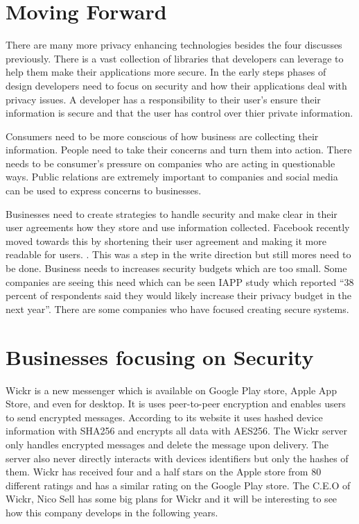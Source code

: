 \documentclass[12pt]{article}
\begin{document}
\section{Moving Forward}\label{sec:moving-forward}
There are many more privacy enhancing technologies besides the four discusses previously. There is a vast collection of libraries that developers can leverage to help them make their applications more secure. In the early steps phases of design developers need to focus on security and how their applications deal with privacy issues. A developer has a responsibility to their user's ensure their information is secure and that the user has control over thier private information. 

Consumers need to be more conscious of how business are collecting their information. People need to take their concerns and turn them into action. There needs to be consumer's pressure on companies who are acting in questionable ways. Public relations are extremely important to companies and social media can be used to express concerns to businesses. 

Businesses need to create strategies to handle security and make clear in their user agreements how they store and use information collected. Facebook recently moved towards this by shortening their user agreement and making it more readable for users. \cite{Albergotti}. This was a step in the write direction but still mores need to be done. Business needs to increases security budgets which are too small. Some companies are seeing this need which can be seen  IAPP study which reported ``38 percent of respondents said they would likely increase their privacy budget in the next year''\cite{Solove}. There are some companies who have focused creating secure systems.

\section{Businesses focusing on Security}\label{sec:real-life}
Wickr is a new messenger which is available on Google Play store, Apple App Store, and even for desktop. It is uses peer-to-peer encryption and enables users to send encrypted messages.  According to its website it uses hashed device information with SHA256 and encrypts all data with AES256. The Wickr server only handles encrypted messages and delete the message upon delivery. The server also never directly interacts with devices identifiers but only the hashes of them. Wickr has received four and a half stars on the Apple store from 80 different ratings and has a similar rating on the Google Play store. The C.E.O of Wickr, Nico Sell has some big plans for Wickr and it will be interesting to see how this company develops in the following years.
\end{document}
